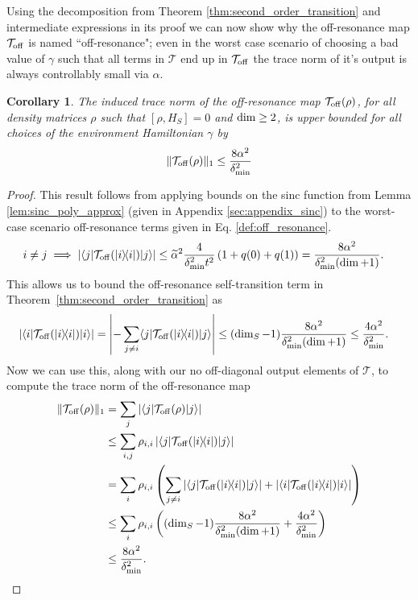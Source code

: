 \documentclass{article}
\newtheorem{corollary}[theorem]{Corollary}
\newcommand{\off}{\rm off}
\newcommand{\ket}[1]{|#1\rangle}
\newcommand{\bra}[1]{\langle #1|}
\newcommand{\ketbra}[2]{| #1\rangle\! \langle #2|}
\newcommand{\abs}[1]{\left| #1 \right|}
\newcommand{\norm}[1]{\| #1 \|}
\begin{document}
Using the decomposition from Theorem \ref{thm:second_order_transition} and intermediate expressions in its proof we can now show why the off-resonance map $\mathcal{T}_{\off}$ is named ``off-resonance"; even in the worst case scenario of choosing a bad value of $\gamma$ such that all terms in $\mathcal{T}$ end up in $\mathcal{T}_{\off}$ the trace norm of it's output is always controllably small via $\alpha$.
\begin{corollary} \label{cor:t_off_norm}
    The induced trace norm of the off-resonance map $\mathcal{T}_{\off}(\rho)$, for all density matrices $\rho$ such that $[\rho, H_S] = 0$ and $\rm{dim}\ge 2$, is upper bounded for all choices of the environment Hamiltonian $\gamma$ by
    \begin{align}
        \norm{\mathcal{T}_{\off}(\rho)}_1 \le \frac{8 \alpha^2}{\delta_{\min}^2}
    \end{align}
\end{corollary}
\begin{proof}
This result follows from applying bounds on the sinc function from Lemma \ref{lem:sinc_poly_approx} (given in Appendix \ref{sec:appendix_sinc}) to the worst-case scenario off-resonance terms given in Eq. \eqref{def:off_resonance}. 
    \begin{align}
        i \neq j \implies \abs{\bra{j}\mathcal{T}_{\off}(\ketbra{i}{i})\ket{j}} &\le \widetilde{\alpha}^2\frac{4}{\delta_{\min}^2 t^2} \left( 1 + q(0) + q(1)\right) = \frac{8 \alpha^2}{\delta_{\min}^2(\dim + 1)}.
    \end{align}
    This allows us to bound the off-resonance self-transition term in Theorem~\ref{thm:second_order_transition} as
    \begin{align}
        \abs{\bra{i}\mathcal{T}_{\off}(\ketbra{i}{i})\ket{i}} &= \abs{- \sum_{j \neq i} \bra{j} \mathcal{T}_{\off}(\ketbra{i}{i}) \ket{j}} \le (\dim_S - 1) \frac{8 \alpha^2}{\delta_{\min}^2 (\dim + 1)} \le \frac{4 \alpha^2}{\delta_{\min}^2}.
    \end{align}
    Now we can use this, along with our no off-diagonal output elements of $\mathcal{T}$, to compute the trace norm of the off-resonance map
    \begin{align}
        \norm{\mathcal{T}_{\off}(\rho)}_1 &= \sum_{j} \abs{\bra{j} \mathcal{T}_{\off}(\rho) \ket{j}} \\
        &\le \sum_{i, j} \rho_{i,i} \abs{\bra{j}\mathcal{T}_{\off}(\ketbra{i}{i})\ket{j}} \\
        &= \sum_{i} \rho_{i,i} \left(\sum_{j \neq i} |\bra{j} \mathcal{T}_{\off}(\ketbra{i}{i}) \ket{j}| + |\bra{i} \mathcal{T}_{\off}(\ketbra{i}{i})\ket{i}| \right) \\
        &\le \sum_{i} \rho_{i,i} \left( (\dim_S - 1) \frac{8 \alpha^2}{\delta_{\min}^2(\dim + 1)} + \frac{4 \alpha^2}{\delta_{\min}^2} \right) \\
        &\le \frac{8 \alpha^2}{\delta_{\min}^2}.
    \end{align}
\end{proof}
\end{document}
